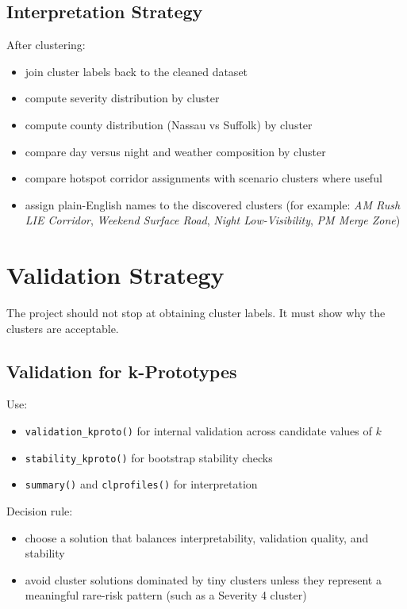\documentclass[11pt]{article}
\begin{document}
\subsection{Interpretation Strategy}

After clustering:

\begin{itemize}
\item join cluster labels back to the cleaned dataset
\item compute severity distribution by cluster
\item compute county distribution (Nassau vs Suffolk) by cluster
\item compare day versus night and weather composition by cluster
\item compare hotspot corridor assignments with scenario clusters where useful
\item assign plain-English names to the discovered clusters (for example: \textit{AM Rush LIE Corridor}, \textit{Weekend Surface Road}, \textit{Night Low-Visibility}, \textit{PM Merge Zone})
\end{itemize}

\section{Validation Strategy}

The project should not stop at obtaining cluster labels. It must show why the clusters are acceptable.

\subsection{Validation for k-Prototypes}

Use:

\begin{itemize}
\item \texttt{validation\_kproto()} for internal validation across candidate values of $k$
\item \texttt{stability\_kproto()} for bootstrap stability checks
\item \texttt{summary()} and \texttt{clprofiles()} for interpretation
\end{itemize}

Decision rule:

\begin{itemize}
\item choose a solution that balances interpretability, validation quality, and stability
\item avoid cluster solutions dominated by tiny clusters unless they represent a meaningful rare-risk pattern (such as a Severity 4 cluster)
\end{itemize}
\end{document}
